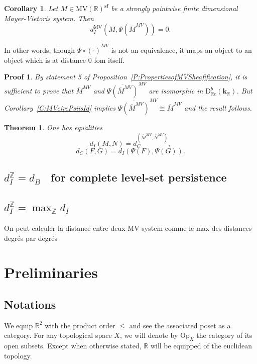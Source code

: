\documentclass[a4paper, english, 11pt]{article}
\newcommand{\kk}[0]{\textbf{k}}
\newcommand{\0}{\vec{0}}
\newcommand{\R}[0]{\mathbb{R}}
\newcommand{\Z}[0]{\mathbb{Z}}
\newcommand{\D}[0]{\text{D}}
\newcommand{\Op}[0]{\text{Op}}
\newcommand{\s}{\textbf{sf}}
\newtheorem*{pf}{Proof} }
\newtheorem{cor}[prop]{Corollary}
\newtheorem{thm}[prop]{Theorem}
\begin{document}
\begin{cor}\label{C:MVdisO}
 Let $M\in \mbox{MV}(\R)^\s$ be a strongly pointwise finite dimensional Mayer-Vietoris system. Then 
 $$d_I^{\text{MV}}(M, \Psi ( \overline{M}^{MV})) = 0. $$
\end{cor}
In other words, though $\Psi \circ \overline{(\cdot)}^{MV}$ is not an equivalence, it maps an object to an object which is at distance $0$ fom itself.
\begin{pf}
 By statement 5 of Proposition~\ref{P:PropertiesofMVSheafification}, it is sufficient to prove that $\overline{M}^{MV}$ and $\overline{\Psi(\overline{M}^{MV})}^{MV}$ are isomorphic in $\D^b_{\R c}(\kk_\R)$. But Corollary~\ref{C:MVcircPsiisId} implies  $\overline{\Psi(\overline{M}^{MV})}^{MV} \cong \overline{M}^{MV}$ and the result follows.
\end{pf}



\begin{thm} One has equalities $$d_I(M, N) = d_C^(\overline{M}^{MV}, \overline{N}^{MV}), $$
$$ d_C(F,G) =d_I(\Psi(F), \Psi(G)).$$
\end{thm}


\subsection{\og $d_I^\Z = d_B$ \fg ~for complete level-set persistence}

\subsection{\og $d_I^\Z = \max_\Z d_I$\fg~}
On peut calculer la distance entre deux MV system comme le max des distances degrés par degrés




\section{Preliminaries}

\subsection{Notations}

We equip $\R^2$ with the product order $\leq$ and see the associated poset as a category. For any topological space $X$, we will denote by $\Op_X$ the category of its open subsets. Except when otherwise stated, $\R$ will be equipped of the euclidean topology. 
\end{document}
